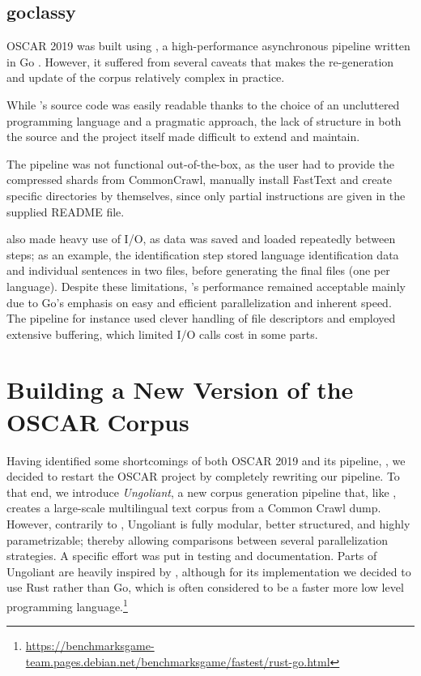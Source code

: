 \subsection{goclassy}

OSCAR 2019 was built using \goclassy, a high-performance asynchronous pipeline written in Go \citep{ortiz-suarez-etal-2019-asynchronous}. However, it suffered from several caveats that makes the re-generation and update of the corpus relatively complex in practice.

While \goclassy's source code was easily readable thanks to the choice of an uncluttered programming language and a pragmatic approach, the lack of structure in both the source and the project itself made \goclassy difficult to extend and maintain.

The pipeline was not functional out-of-the-box, as the user had to provide the compressed shards from CommonCrawl, manually install FastText \citep{joulin-etal-2016-fasttext,joulin-etal-2017-bag} and create specific directories by themselves, since only partial instructions are given in the supplied README file.

\goclassy also made heavy use of I/O, as data was saved and loaded repeatedly between steps; as an example, the identification step stored language identification data and individual sentences in two files, before generating the final files (one per language). Despite these limitations, \goclassy's performance remained acceptable mainly due to Go's emphasis on easy and efficient parallelization and inherent speed. The pipeline for instance used clever handling of file descriptors and employed extensive buffering, which limited I/O calls cost in some parts.

\section{Building a New Version of the OSCAR Corpus}

Having identified some shortcomings of both OSCAR 2019 and its pipeline, \goclassy, we decided to restart the OSCAR project by completely rewriting our pipeline. To that end, we introduce \emph{Ungoliant}, a new corpus generation pipeline that, like \goclassy, creates a large-scale multilingual text corpus from a Common Crawl dump. However, contrarily to \goclassy, Ungoliant is fully modular, better structured, and highly parametrizable; thereby allowing comparisons between several parallelization strategies. A specific effort was put in testing and documentation. Parts of Ungoliant are heavily inspired by \goclassy, although for its implementation we decided to use Rust rather than Go, which is often considered to be a faster more low level programming language.\footnote{\url{https://benchmarksgame-team.pages.debian.net/benchmarksgame/fastest/rust-go.html}}

